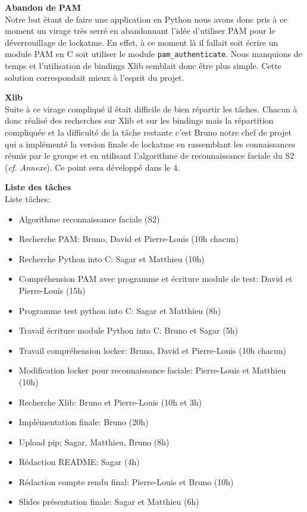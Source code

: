 \documentclass[french]{report}
\begin{document}
  \vspace{0.5cm}

  \textbf{Abandon de PAM}\\

  Notre but étant de faire une application en Python nous avons donc pris à ce
  moment un virage très serré en abandonnant l’idée d’utiliser PAM pour le
  déverrouillage de lockatme. En effet, à ce moment là il fallait soit écrire un
  module PAM en C soit utiliser le module \texttt{pam\_authenticate}. Nous
  manquions de temps et l’utilisation de bindings Xlib semblait donc être plus
  simple. Cette solution correspondait mieux à l’esprit du
  projet.

  \vspace{0.5cm}

  \textbf{Xlib}\\

  Suite à ce virage compliqué il était difficile de bien répartir les tâches.
  Chacun à donc réalisé des recherches sur Xlib et sur les bindings mais la
  répartition compliquée et la difficulté de la tâche restante c’est
  Bruno notre chef de projet qui a implémenté la version finale de lockatme en
  rassemblant les connaissances réunis par le groupe et en utilisant
  l’algorithme de reconnaissance faciale du S2 (\emph{cf. Annexe}).
  Ce point sera développé dans le 4.

  \vspace{0.5cm}

\newpage

\textbf{Liste des tâches}\\

Liste tâches:
  \begin{itemize}[label=\textbullet, font=\normalfont \color{blue}]
  \item{Algorithme reconnaissance faciale (S2)}
  \item{Recherche PAM: Bruno, David et Pierre-Louis (10h chacun)}
  \item{Recherche Python into C: Sagar et Matthieu (10h)}
  \item{Compréhension PAM avec programme et écriture module de test: David et
  Pierre-Louis (15h)}
  \item{Programme test python into C: Sagar et Matthieu (8h)}
  \item{Travail écriture module Python into C: Bruno et Sagar (5h)}
  \item{Travail compréhension locker: Bruno, David et Pierre-Louis (10h chacun)}
  \item{Modification locker pour reconnaissance faciale: Pierre-Louis et Matthieu (10h)}
  \item{Recherche Xlib: Bruno et Pierre-Louis (10h et 3h)}
  \item{Implémentation finale: Bruno (20h)}
  \item{Upload pip: Sagar, Matthieu, Bruno (8h)}
  \item{Rédaction README: Sagar (4h)}
  \item{Rédaction compte rendu final: Pierre-Louis et Bruno (10h)}
  \item{Slides présentation finale: Sagar et Matthieu (6h)}
\end{itemize}
\end{document}
